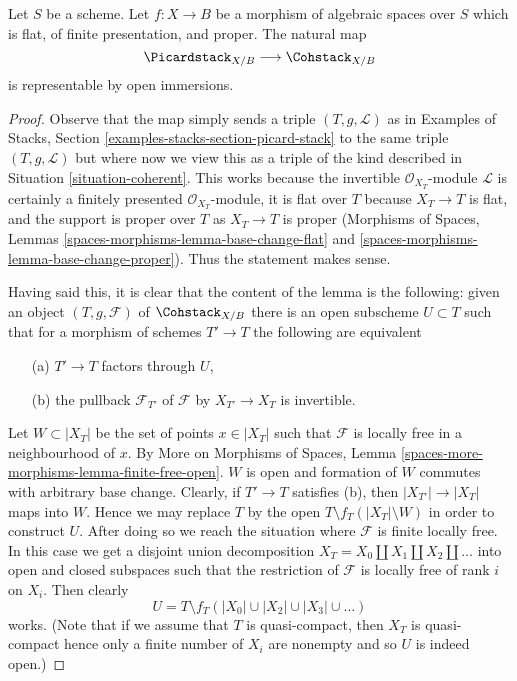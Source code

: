 \begin{lemma}
\label{lemma-picard-stack-open-in-coh}
Let $S$ be a scheme. Let $f : X \to B$ be a morphism of algebraic spaces
over $S$ which is flat, of finite presentation, and proper.
The natural map
$$
\Picardstack_{X/B} \longrightarrow \Cohstack_{X/B}
$$
is representable by open immersions.
\end{lemma}

\begin{proof}
Observe that the map simply sends a triple $(T, g, \mathcal{L})$
as in Examples of Stacks, Section \ref{examples-stacks-section-picard-stack}
to the same triple $(T, g, \mathcal{L})$ but where now we view
this as a triple of the kind described in
Situation \ref{situation-coherent}.
This works because the invertible $\mathcal{O}_{X_T}$-module
$\mathcal{L}$ is certainly a finitely presented $\mathcal{O}_{X_T}$-module,
it is flat over $T$ because $X_T \to T$ is flat, and the support is
proper over $T$ as $X_T \to T$ is proper
(Morphisms of Spaces, Lemmas \ref{spaces-morphisms-lemma-base-change-flat}
and \ref{spaces-morphisms-lemma-base-change-proper}).
Thus the statement makes sense.

\medskip\noindent
Having said this, it is clear that the content of the lemma is the
following: given an object $(T, g, \mathcal{F})$ of
$\Cohstack_{X/B}$ there is an open subscheme $U \subset T$
such that for a morphism of schemes $T' \to T$ the following
are equivalent
\begin{enumerate}
\item[(a)] $T' \to T$ factors through $U$,
\item[(b)] the pullback $\mathcal{F}_{T'}$ of
$\mathcal{F}$ by $X_{T'} \to X_T$ is invertible.
\end{enumerate}
Let $W \subset |X_T|$ be the set of points $x \in |X_T|$
such that $\mathcal{F}$ is locally free in a neighbourhood of $x$. By
More on Morphisms of Spaces, Lemma
\ref{spaces-more-morphisms-lemma-finite-free-open}.
$W$ is open and formation
of $W$ commutes with arbitrary base change.
Clearly, if $T' \to T$ satisfies (b), then $|X_{T'}| \to |X_T|$
maps into $W$. Hence we may replace $T$ by the open
$T \setminus f_T(|X_T| \setminus W)$ in order
to construct $U$. After doing so we reach the situation
where $\mathcal{F}$ is finite locally free.
In this case we get a disjoint union decomposition
$X_T = X_0 \amalg X_1 \amalg X_2 \amalg \ldots$
into open and closed subspaces such that the restriction of
$\mathcal{F}$ is locally free of rank $i$ on $X_i$. Then clearly
$$
U = T \setminus f_T(|X_0| \cup |X_2| \cup |X_3| \cup \ldots )
$$
works. (Note that if we assume that $T$ is quasi-compact, then
$X_T$ is quasi-compact hence only a finite number of $X_i$
are nonempty and so $U$ is indeed open.)
\end{proof}

